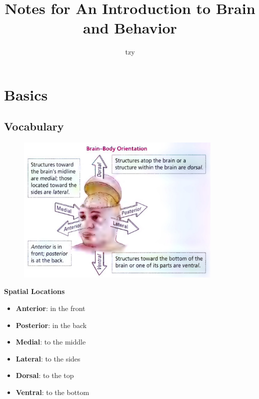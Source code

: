 \documentclass[12pt]{article}
\title{Notes for An Introduction to Brain and Behavior}
\author{tzy}
\begin{document}
\maketitle
\tableofcontents
\newpage
\section{Basics}

\subsection{Vocabulary}

\begin{figure}[h]
    \includegraphics[width=0.88\textwidth]{brain_body_orientation.png}
\end{figure}

\textbf{Spatial Locations}
\begin{itemize}
\item {\textbf{Anterior}:   in the front}
\item {\textbf{Posterior}:  in the back}
\item {\textbf{Medial}:     to the middle}
\item {\textbf{Lateral}:    to the sides}
\item {\textbf{Dorsal}:     to the top}
\item {\textbf{Ventral}:    to the bottom}
\end{itemize}
\end{document}
